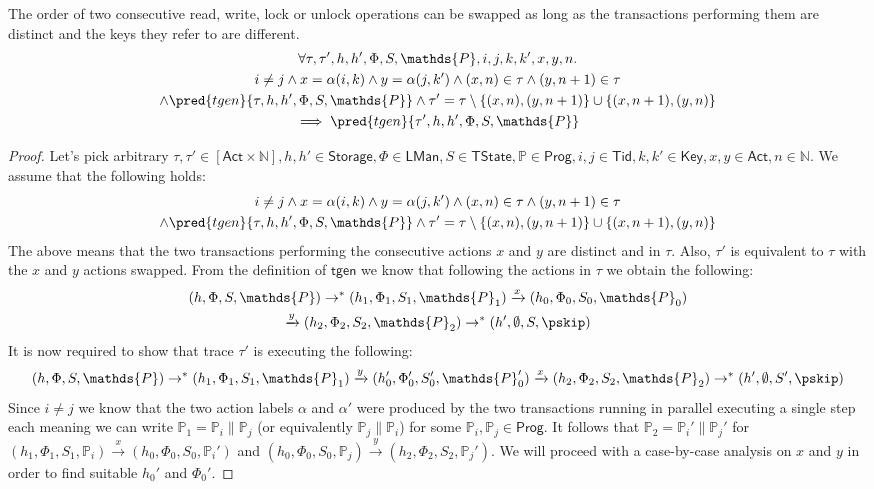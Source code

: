 \lem The order of two consecutive read, write, lock or unlock operations can be swapped as long as the transactions performing them are distinct and the keys they refer to are different.
\begin{gather*}
	\forall \tau, \tau', h, h', \Phi, S, \mathds{P}, i, j, k, k', x, y, n \ldotp \\
		i \neq j \land x = \alpha(i, k) \land y = \alpha(j, k') \land (x, n) \in \tau \land (y, n+1) \in \tau \\ \land \pred{tgen}{\tau, h, h', \Phi, S, \mathds{P}} \land \tau' = \tau \setminus \{(x, n), (y, n+1)\} \cup \{ (x, n+1), (y, n) \}
		\\	 
	 \implies \pred{tgen}{\tau', h, h', \Phi, S, \mathds{P}}
\end{gather*}
\begin{proof}
Let's pick arbitrary $\tau, \tau' \in [\mathsf{Act} \times \mathds{N}], h, h' \in \mathsf{Storage}, \Phi \in \mathsf{LMan}, S \in \mathsf{TState}, \mathds{P} \in \mathsf{Prog}, i, j \in \mathsf{Tid}, k, k' \in \mathsf{Key}, x, y \in \mathsf{Act}, n \in \mathds{N}$. We assume that the following holds:
\begin{gather}
	i \neq j \land x = \alpha(i, k) \land y = \alpha(j, k') \land (x, n) \in \tau \land (y, n+1) \in \tau \\ \land \pred{tgen}{\tau, h, h', \Phi, S, \mathds{P}} \land \tau' = \tau \setminus \{(x, n), (y, n+1)\} \cup \{ (x, n+1), (y, n) \}
\end{gather}
The above means that the two transactions performing the consecutive actions $x$ and $y$ are distinct and in $\tau$. Also, $\tau'$ is equivalent to $\tau$ with the $x$ and $y$ actions swapped. From the definition of $\mathsf{tgen}$ we know that following the actions in $\tau$ we obtain the following:
\begin{gather}
	\label{lem:xy1} (h, \Phi, S, \mathds{P}) \rightarrow^* (h_1, \Phi_1, S_1, \mathds{P}_1) \xrightarrow{x} (h_0, \Phi_0, S_0, \mathds{P}_0) \\
	\label{lem:xy2} \xrightarrow{y} (h_2, \Phi_2, S_2, \mathds{P}_2) \rightarrow^* (h', \emptyset, S, \pskip)
\end{gather}
It is now required to show that trace $\tau'$ is executing the following:
\[
	(h, \Phi, S, \mathds{P}) \rightarrow^* (h_1, \Phi_1, S_1, \mathds{P}_1) \xrightarrow{y} (h_0', \Phi_0', S_0', \mathds{P}_0') \xrightarrow{x} (h_2, \Phi_2, S_2, \mathds{P}_2) \rightarrow^* (h', \emptyset, S', \pskip)
\]
Since $i \neq j$ we know that the two action labels $\alpha$ and $\alpha'$ were produced by the two transactions running in parallel executing a single step each meaning we can write $\mathds{P}_1 = \mathds{P}_i \| \mathds{P}_j$ (or equivalently $\mathds{P}_j \| \mathds{P}_i$) for some $\mathds{P}_i, \mathds{P}_j \in \mathsf{Prog}$. It follows that $\mathds{P}_2 = \mathds{P}_i' \| \mathds{P}_j'$ for $(h_1, \Phi_1, S_1, \mathds{P}_i) \xrightarrow{x} (h_0, \Phi_0, S_0, \mathds{P}_i')$ and $(h_0, \Phi_0, S_0, \mathds{P}_j) \xrightarrow{y} (h_2, \Phi_2, S_2, \mathds{P}_j')$. We will proceed with a case-by-case analysis on $x$ and $y$ in order to find suitable $h_0'$ and $\Phi_0'$.

\end{proof}
